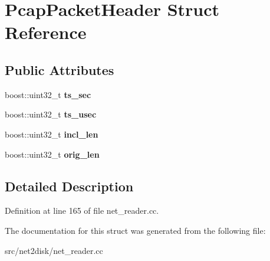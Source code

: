 \hypertarget{struct_pcap_packet_header}{
\section{PcapPacketHeader Struct Reference}
\label{struct_pcap_packet_header}
}
\subsection*{Public Attributes}
\begin{DoxyCompactItemize}
\item 
\hypertarget{struct_pcap_packet_header_aa6aed15a28e8e4adf47597b50ae0b22c}{
boost::uint32\_\-t {\bfseries ts\_\-sec}}
\label{struct_pcap_packet_header_aa6aed15a28e8e4adf47597b50ae0b22c}

\item 
\hypertarget{struct_pcap_packet_header_a49d674eaebf01d367204e4ac3dc56209}{
boost::uint32\_\-t {\bfseries ts\_\-usec}}
\label{struct_pcap_packet_header_a49d674eaebf01d367204e4ac3dc56209}

\item 
\hypertarget{struct_pcap_packet_header_a64aa3aee0f9d090553e0226146a78409}{
boost::uint32\_\-t {\bfseries incl\_\-len}}
\label{struct_pcap_packet_header_a64aa3aee0f9d090553e0226146a78409}

\item 
\hypertarget{struct_pcap_packet_header_aee7e317a501af72f2828be978647be8f}{
boost::uint32\_\-t {\bfseries orig\_\-len}}
\label{struct_pcap_packet_header_aee7e317a501af72f2828be978647be8f}

\end{DoxyCompactItemize}


\subsection{Detailed Description}


Definition at line 165 of file net\_\-reader.cc.



The documentation for this struct was generated from the following file:\begin{DoxyCompactItemize}
\item 
src/net2disk/net\_\-reader.cc\end{DoxyCompactItemize}
